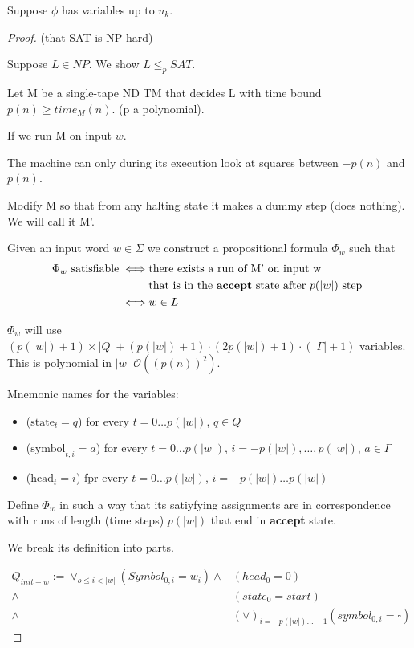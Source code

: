 \documentclass[a4paper,12pt]{article}
\theoremstyle{definition}
\theoremstyle{remark}
\begin{document}
Suppose $\phi$ has variables up to $u_k$.

\begin{proof}(that SAT is NP hard)

    Suppose $L \in NP$. We show $L \leq_p SAT$.

    Let M be a single-tape ND TM that decides L with time bound $p(n) \geq time_M(n)$. (p a polynomial).

    If we run M on input $w$.

    The machine can only during its execution look at squares between $-p(n)$ and $p(n)$.

    Modify M so that from any halting state it makes a dummy step (does nothing). We will call it M'.

    Given an input word $w \in \Sigma$ we construct a propositional formula $\Phi_w$ such that
    \begin{align*}
        \Phi_w  \text{ satisfiable} \iff& \text{there exists a run of M' on input w} \\
                                       &\text{that is in the \textbf{accept} state after } p(|w|) \text{ step } \\
                                   \iff& w \in L
    \end{align*}

    $\Phi_w$ will use $(p(|w|) + 1) \times |Q| + (p(|w|) + 1) \cdot (2p(|w|) +1) \cdot (|\Gamma| + 1)$ variables. This
    is polynomial in $|w|$ $\mathscr{O}((p(n))^2)$.

    Mnemonic names for the variables:
    \begin{itemize}
        \item ($\text{state}_t = q$) for every $t = 0 \dots p(|w|)$, $q \in Q$
        \item ($\text{symbol}_{t, i} = a$) for every $t = 0 \dots p(|w|)$, $i = -p(|w|), \dots, p(|w|)$, $a \in \Gamma$
        \item ($\text{head}_t = i$) fpr every $t = 0 \dots p(|w|)$, $i = -p(|w|) \dots p(|w|)$ 
    \end{itemize}

    Define $\Phi_w$ in such a way that its satiyfying assignments are in correspondence with runs of length
    (time steps) $p(|w|)$ that end in \textbf{accept} state.

    We break its definition into parts.

    \begin{align*}
        Q_{init-w} := \vee_{o \leq i < |w|} (Symbol_{0, i} = w_i) \land& (head_0 = 0) \\
                                                                  \land& (state_0 = start) \\
                                                                  \land& (\vee)_{i = -p(|w|) \dots -1} (symbol_{0, i} = \square)
    \end{align*}
\end{proof}
\end{document}
